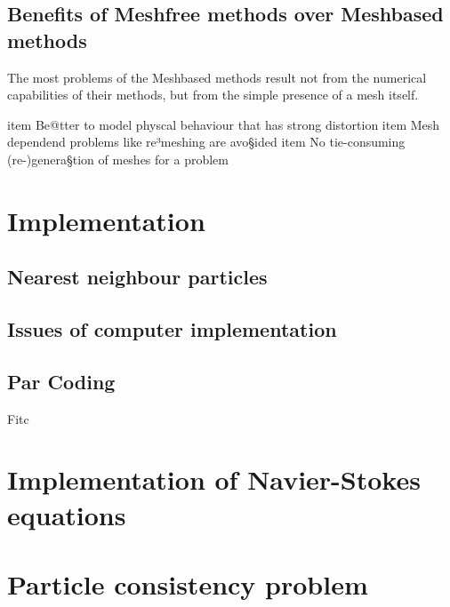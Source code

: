 \subsection{Benefits of Meshfree methods over Meshbased methods}
The most problems of the Meshbased methods result not from the numerical capabilities of their methods, but from the simple presence of a mesh itself. 

item Be@tter to model physcal behaviour that has strong distortion
item Mesh dependend problems like re³meshing are avo§ided
item No tie-consuming (re-)genera§tion of meshes for a problem 

\section{Implementation}

\subsection{Nearest neighbour particles}

\subsection{Issues of computer implementation}

\subsection{Par Coding}


Fitc


\section{Implementation of Navier-Stokes equations}


\section{Particle consistency problem}

